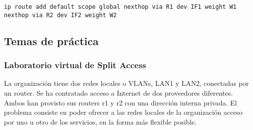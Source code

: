 \begin{lstlisting}
ip route add default scope global nexthop via R1 dev IF1 weight W1 nexthop via R2 dev IF2 weight W2
\end{lstlisting}


% 
% 

\subsection{Temas de práctica}
\subsubsection{Laboratorio virtual de Split Access}
La organización tiene dos redes locales o VLANs, LAN1 y LAN2, conectadas por un router. Se ha contratado acceso a Internet de dos proveedores diferentes. Ambos han provisto sus routers r1 y r2 con una dirección interna privada. El problema consiste en poder ofrecer a las redes locales de la organización acceso por uno u otro de los servicios, en la forma más flexible posible.


